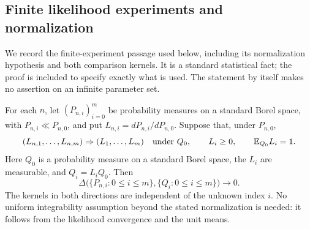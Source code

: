 \subsection{Finite likelihood experiments and normalization}
\label{subsec:v33-finite-experiments}

We record the finite-experiment passage used below, including its
normalization hypothesis and both comparison kernels.  It is a standard
statistical fact; the proof is included to specify exactly what is used.
The statement by itself makes no assertion on an infinite parameter set.

\begin{lemma}
\label{lem:v33-finite-likelihood}
For each \(n\), let \((P_{n,i})_{i=0}^m\) be probability measures on a
standard Borel space, with \(P_{n,i}\ll P_{n,0}\), and put
\(L_{n,i}=dP_{n,i}/dP_{n,0}\).  Suppose that, under \(P_{n,0}\),
\[
 (L_{n,1},\ldots,L_{n,m})\Rightarrow (L_1,\ldots,L_m)
 \quad\hbox{under }Q_0,
 \qquad L_i\ge0,\qquad \mathbb E_{Q_0}L_i=1.
\]
Here \(Q_0\) is a probability measure on a standard Borel space, the
\(L_i\) are measurable, and \(Q_i=L_iQ_0\).  Then
\begin{equation}\label{eq:v33-finite-likelihood-distance}
 \Delta\bigl(\{P_{n,i}:0\le i\le m\},
             \{Q_i:0\le i\le m\}\bigr)\longrightarrow0.
\end{equation}
The kernels in both directions are independent of the unknown index \(i\).
No uniform integrability assumption beyond the stated normalization is
needed: it follows from the likelihood convergence and the unit means.
\end{lemma}


